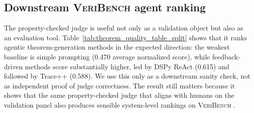 \documentclass{article}
\begin{document}
\begin{table}[H]
  \renewcommand{\arraystretch}{1.30}
  \centering
  \caption{\textbf{Theorem quality scores on \textsc{VeriBench}.} Average normalized scores by split: Easy, CS, Real, HumanEval, and Security.
    All rows use Claude~3.7 as the agent model and as the LLM judge.
    Trace+ denotes the trace self-debug agent and Trace++ the self-debug and self-improve agent.
    The DSPy ReAct agent only performs self-debug.
    The LLM judge issues 5 scoring calls per file pair and returns an integer rubric score in $\{0,1,\dots,10\}$.
    Normalized scores are computed by dividing by the maximum score (10) and averaging across all examples.
    The Avg Norm Score shows the overall average over the entire benchmark.}
  \label{tab:theorem_quality_table_split}
\end{table}

\subsection{Downstream \textsc{VeriBench} agent ranking}
The property-checked judge is useful not only as a validation object but also as an evaluation tool. Table~\ref{tab:theorem_quality_table_split} shows that it ranks agentic theorem-generation methods in the expected direction: the weakest baseline is simple prompting (0.470 average normalized score), while feedback-driven methods score substantially higher, led by DSPy ReAct (0.615) and followed by Trace++ (0.588). We use this only as a downstream sanity check, not as independent proof of judge correctness. The result still matters because it shows that the same property-checked judge that aligns with humans on the validation panel also produces sensible system-level rankings on \textsc{VeriBench} \citep{khattab2024dspy,cheng2024trace,chen2021evaluating}.
\end{document}
